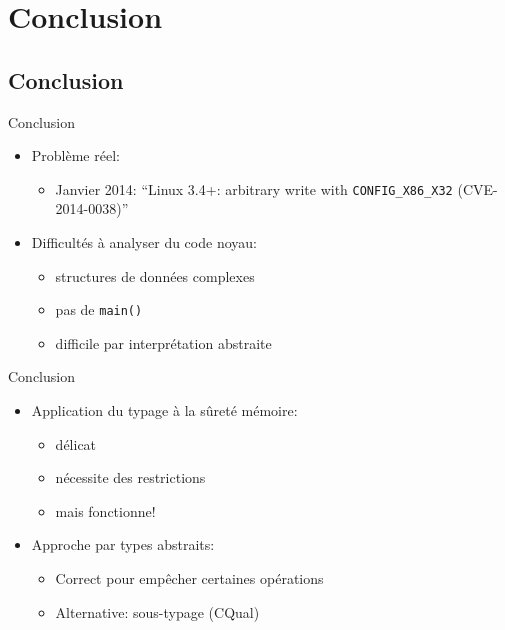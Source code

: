 \section{Conclusion}
\subsection{Conclusion}


\begin{frame}{Conclusion}
    \begin{itemize}
    \item Problème réel:
        \begin{itemize}
            \item Janvier 2014:
                \enquote{Linux 3.4+: arbitrary write with \texttt{CONFIG\_X86\_X32} (CVE-2014-0038)}
        \end{itemize}
    \item Difficultés à analyser du code noyau:
        \begin{itemize}
            \item structures de données complexes
            \item pas de \texttt{main()}
            \item difficile par interprétation abstraite
        \end{itemize}
    \end{itemize}
\end{frame}

\begin{frame}{Conclusion}
    \begin{itemize}
    \item Application du typage à la sûreté mémoire:
        \begin{itemize}
            \item délicat
            \item nécessite des restrictions
            \item mais fonctionne!
        \end{itemize}
    \item Approche par types abstraits:
        \begin{itemize}
            \item Correct pour empêcher certaines opérations
            \item Alternative: sous-typage (CQual)
        \end{itemize}
    \end{itemize}
\end{frame}

